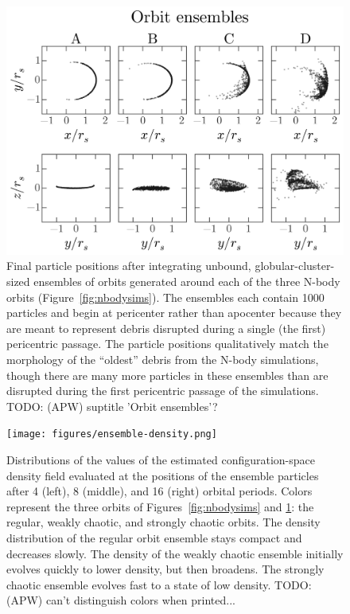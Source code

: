 \documentclass[letterpaper,12pt,preprint]{aastex}
\newcommand{\todo}[2]{{\color{red} TODO: (\MakeUppercase{#1}) #2}}
\begin{document}
\begin{figure}[p]
\begin{center}
\includegraphics[width=\textwidth]{figures/ensembles.png}
\caption{Final particle positions after integrating unbound, globular-cluster-sized ensembles of orbits generated around each of the three N-body orbits (Figure~\ref{fig:nbodysims}). The ensembles each contain 1000 particles and begin at pericenter rather than apocenter because they are meant to represent debris disrupted during a single (the first) pericentric passage. The particle positions qualitatively match the morphology of the ``oldest'' debris from the N-body simulations, though there are many more particles in these ensembles than are disrupted during the first pericentric passage of the simulations. \todo{apw}{suptitle 'Orbit ensembles'?} } \label{fig:ensembles}
\end{center}
\end{figure}

\clearpage
\begin{figure}[p]
\begin{center}
\texttt{[image: figures/ensemble-density.png]}
\caption{ Distributions of the values of the estimated configuration-space density field evaluated at the positions of the ensemble particles after 4 (left), 8 (middle), and 16 (right) orbital periods. Colors represent the three orbits of Figures~\ref{fig:nbodysims} and \ref{fig:ensembles}: the regular, weakly chaotic, and strongly chaotic orbits. The density distribution of the regular orbit ensemble stays compact and decreases slowly. The density of the weakly chaotic ensemble initially evolves quickly to lower density, but then broadens. The strongly chaotic ensemble evolves fast to a state of low density. \todo{apw}{can't distinguish colors when printed...}} \label{fig:ensemble-density}
\end{center}
\end{figure}
\end{document}
